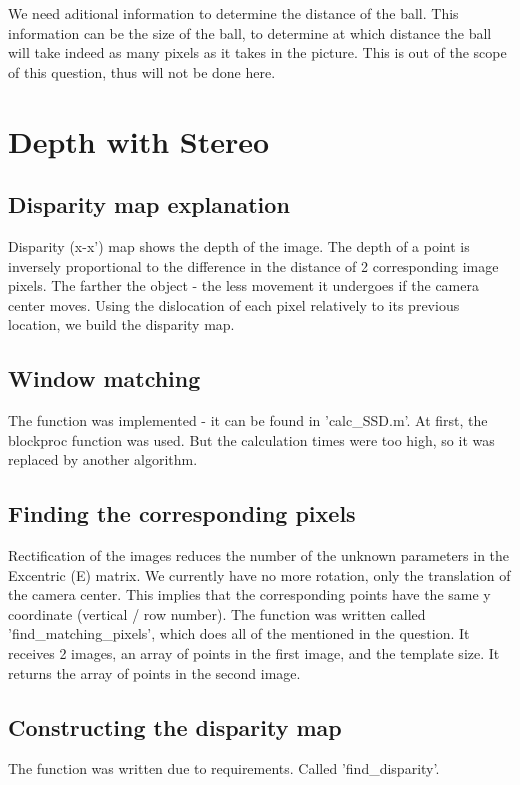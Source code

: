\documentclass[a4paper]{iacas}
\begin{document}
We need aditional information to determine the distance of the ball. This information can be the size of the ball, to determine at which distance the ball will take indeed as many pixels as it takes in the picture. This is out of the scope of this question, thus will not be done here. 





\newpage
\section{Depth with Stereo}
\subsection{Disparity map explanation}
Disparity (x-x') map shows the depth of the image. The depth of a point is inversely proportional to the difference in the distance of 2 corresponding image pixels. The farther the object - the less movement it undergoes if the camera center moves. Using the dislocation of each pixel relatively to its previous location, we build the disparity map. 



\subsection{Window matching}
The function was implemented - it can be found in 'calc\_SSD.m'. At first, the blockproc function was used. But the calculation times were too high, so it was replaced by another algorithm.


\subsection{Finding the corresponding pixels}
Rectification of the images reduces the number of the unknown parameters in the Excentric (E) matrix. We currently have no more rotation, only the translation of the camera center. This implies that the corresponding points have the same y coordinate (vertical / row number).
\newline
The function was written called 'find\_matching\_pixels', which does all of the mentioned in the question. It receives 2 images, an array of points in the first image, and the template size. It returns the array of points in the second image.

\subsection{Constructing the disparity map}
The function was written due to requirements. Called 'find\_disparity'.
\end{document}
